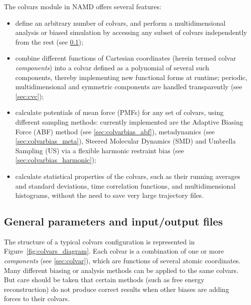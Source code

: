 The colvars module in NAMD offers several features:
\begin{itemize}

\item define an arbitrary number of colvars, and perform a
  multidimensional analysis or biased simulation by accessing any
  subset of colvars independently from the rest (see
  \ref{sec:colvarmodule});

\item combine different functions of Cartesian coordinates (herein
  termed colvar \emph{components}) into a colvar defined as a
  polynomial of several such components, thereby implementing new
  functional forms at runtime; periodic, multidimensional and
  symmetric components are handled transparently (see \ref{sec:cvc});

\item calculate potentials of mean force (PMFs) for any set of
  colvars, using different sampling methods: currently implemented are
  the Adaptive Biasing Force (ABF) method (see
  \ref{sec:colvarbias_abf}), metadynamics (see
  \ref{sec:colvarbias_meta}), Steered Molecular Dynamics (SMD) and
  Umbrella Sampling (US) via a flexible harmonic restraint bias (see
  \ref{sec:colvarbias_harmonic});

\item calculate statistical properties of the colvars, such as their
  running averages and standard deviations, time correlation
  functions, and multidimensional histograms, without the need to save
  very large trajectory files.

\end{itemize}


\subsection{General parameters and input/output files}
\label{sec:colvarmodule}

The structure of a typical colvars configuration is represented in
Figure~\ref{fig:colvars_diagram}.  Each colvar is a combination of one
or more \emph{components} (see \ref{sec:colvar}), which are functions
of several atomic coordinates.  Many different biasing or analysis
methods can be applied to the same colvars.  But care should be taken
that certain methods (such as free energy reconstruction) do not
produce correct results when other biases are adding forces to their
colvars.

